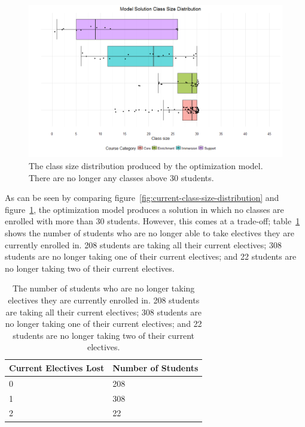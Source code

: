\documentclass[12pt]{article}
\begin{document}
\begin{figure}
\centering
	\includegraphics[width=\linewidth]{./model_solution_class_size_distribution}
	\caption{The class size distribution produced by the optimization model. There are no longer any classes above 30 students.}
	\label{fig:model-class-size-distribution}
\end{figure}

As can be seen by comparing figure~\ref{fig:current-class-size-distribution} and figure~\ref{fig:model-class-size-distribution}, the optimization model produces a solution in which no classes are enrolled with more than 30 students. However, this comes at a trade-off; table~\ref{tab:num-electives-lost} shows the number of students who are no longer able to take electives they are currently enrolled in. 208 students are taking all their current electives; 308 students are no longer taking one of their current electives; and 22 students are no longer taking two of their current electives.

\begin{table}[]
\centering
\caption{The number of students who are no longer taking electives they are currently enrolled in. 208 students are taking all their current electives; 308 students are no longer taking one of their current electives; and 22 students are no longer taking two of their current electives.}
\label{tab:num-electives-lost}
\begin{tabular}{ll}
\hline
Current Electives Lost & Number of Students \\ \hline
0                      & 208                \\
1                      & 308                \\
2                      & 22                 \\ \hline
\end{tabular}
\end{table}
\end{document}
